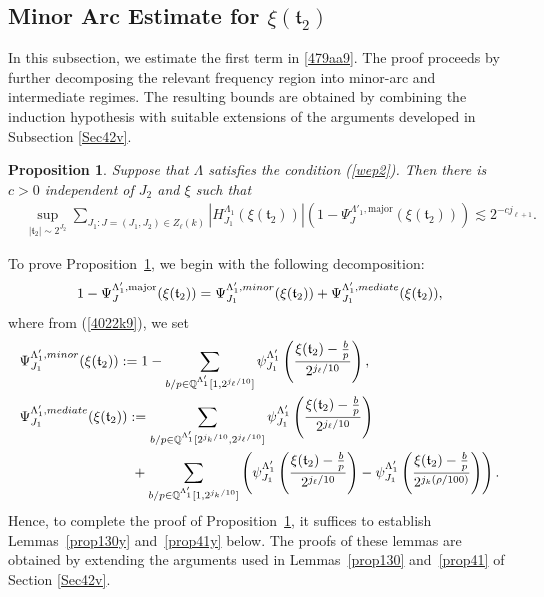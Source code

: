 \documentclass[10pt,a4paper]{amsart}
\newtheorem{proposition}{Proposition}\numberwithin{proposition}{section}
\numberwithin{equation}{section}
\begin{document}
\subsection{Minor Arc Estimate for $\xi(\mathfrak{t}_2)$}\label{sec5.1}
In this subsection, we estimate the first term in \eqref{479aa9}. The proof proceeds by further decomposing the relevant frequency region into minor-arc and intermediate regimes. The resulting bounds are obtained by combining the induction hypothesis with suitable extensions of the arguments developed in  Subsection \ref{Sec42v}.


\begin{proposition}\label{prop419b9}
Suppose that $\Lambda$ satisfies   the  condition (\ref{wep2}). Then
there is $c>0$  independent of $J_2$ and $\xi$ such that
\begin{align*}
&\sup_{|\mathfrak{t}_2|\sim 2^{J_2}}\sum_{J_1: J=(J_1,J_2)\in Z_\ell(k)}   |H^{\Lambda_{1}}_{J_1}( \xi(\mathfrak{t}_2))|  \left(1-\Psi_{J}^{\Lambda'_1,\mathrm{major}}(\xi(\mathfrak{t}_2))  \right) \lesssim 2^{-cj_{\ell+1}}.
\end{align*}
\end{proposition} 


To prove Proposition~\ref{prop419b9}, we begin with the following decomposition: 
$$1-\Psi_{J}^{\Lambda'_1,\mathrm{major}}(\xi(\mathfrak{t}_2))=\Psi^{\Lambda'_1,\rm{minor}}_{J_1}(\xi(\mathfrak{t}_2)) +
\Psi^{\Lambda'_1,\rm{mediate}}_{J_1}(\xi(\mathfrak{t}_2)),$$
where  from (\ref{4022k9}), we set
\begin{align*} 
&\Psi^{\Lambda'_1,\rm{minor}}_{J_1}(\xi(\mathfrak{t}_2)) :=1 -\sum_{b/p\in  \mathbb{Q}^{\Lambda'_1}[1,2^{j_{\ell}/10}]}\psi^{\Lambda'_1}_{J_1}\left(\frac{\xi(\mathfrak{t}_2)-\frac{b}{p}}{2^{j_{\ell}/10}}\right),\nonumber \\
&\Psi^{\Lambda'_1,\rm{mediate}}_{J_1}(\xi(\mathfrak{t}_2)):=\sum_{b/p\in  \mathbb{Q}^{\Lambda'_1}[2^{j_{k}/10},2^{j_{\ell}/10}]}\psi^{\Lambda_1'}_{J_1}\left(\frac{\xi(\mathfrak{t}_2)-\frac{b}{p}}{2^{j_{\ell}/10}}\right)  \\
&\qquad\quad\qquad\qquad\quad+
\sum_{b/p\in  \mathbb{Q}^{\Lambda'_1}[1,2^{j_k/10}]}
 \left( \psi^{\Lambda'_1}_{J_1}\left(\frac{\xi(\mathfrak{t}_2)-\frac{b}{p}}{2^{j_{\ell}/10}}\right)-\psi^{\Lambda'_1}_{J_1}\left(\frac{\xi(\mathfrak{t}_2)-\frac{b}{p}}{2^{j_{k}(\rho/100)}}\right) \right).\nonumber
    \end{align*}
 Hence, to complete the proof of Proposition~\ref{prop419b9}, it suffices to
establish Lemmas~\ref{prop130y} and~\ref{prop41y} below.  
The proofs of these lemmas are obtained by extending
the arguments used in Lemmas~\ref{prop130} and~\ref{prop41} of Section \ref{Sec42v}.
\end{document}
